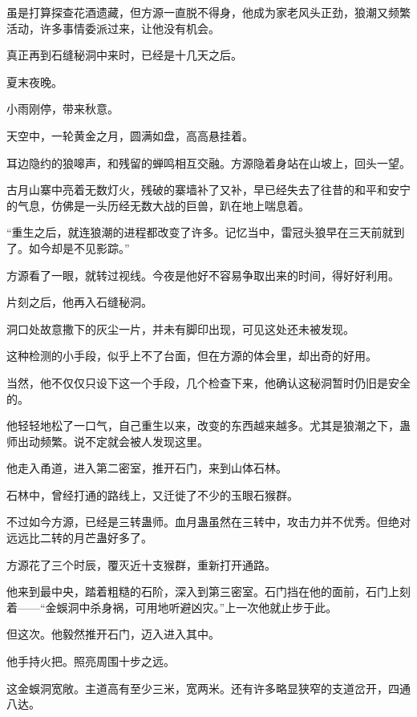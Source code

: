 
\begin{this_body}



虽是打算探查花酒遗藏，但方源一直脱不得身，他成为家老风头正劲，狼潮又频繁活动，许多事情委派过来，让他没有机会。

真正再到石缝秘洞中来时，已经是十几天之后。

夏末夜晚。

小雨刚停，带来秋意。

天空中，一轮黄金之月，圆满如盘，高高悬挂着。

耳边隐约的狼嗥声，和残留的蝉鸣相互交融。方源隐着身站在山坡上，回头一望。

古月山寨中亮着无数灯火，残破的寨墙补了又补，早已经失去了往昔的和平和安宁的气息，仿佛是一头历经无数大战的巨兽，趴在地上喘息着。

“重生之后，就连狼潮的进程都改变了许多。记忆当中，雷冠头狼早在三天前就到了。如今却是不见影踪。”

方源看了一眼，就转过视线。今夜是他好不容易争取出来的时间，得好好利用。

片刻之后，他再入石缝秘洞。

洞口处故意撒下的灰尘一片，并未有脚印出现，可见这处还未被发现。

这种检测的小手段，似乎上不了台面，但在方源的体会里，却出奇的好用。

当然，他不仅仅只设下这一个手段，几个检查下来，他确认这秘洞暂时仍旧是安全的。

他轻轻地松了一口气，自己重生以来，改变的东西越来越多。尤其是狼潮之下，蛊师出动频繁。说不定就会被人发现这里。

他走入甬道，进入第二密室，推开石门，来到山体石林。

石林中，曾经打通的路线上，又迁徙了不少的玉眼石猴群。

不过如今方源，已经是三转蛊师。血月蛊虽然在三转中，攻击力并不优秀。但绝对远远比二转的月芒蛊好多了。

方源花了三个时辰，覆灭近十支猴群，重新打开通路。

他来到最中央，踏着粗糙的石阶，深入到第三密室。石门挡在他的面前，石门上刻着——“金蜈洞中杀身祸，可用地听避凶灾。”上一次他就止步于此。

但这次。他毅然推开石门，迈入进入其中。

他手持火把。照亮周围十步之远。

这金蜈洞宽敞。主道高有至少三米，宽两米。还有许多略显狭窄的支道岔开，四通八达。


\end{this_body}
